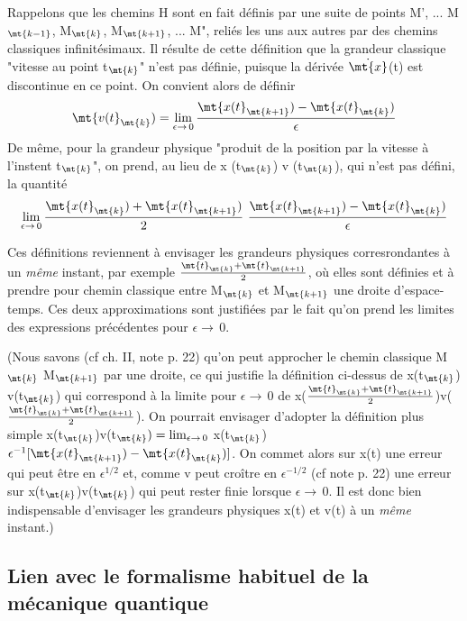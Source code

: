 Rappelons que les chemins H sont en fait définis par une
suite de points M', ... M$_\mt{k-1}$, M$_\mt{k}$, M$_\mt{k+1}$, ... M", reliés les uns aux autres
par des chemins classiques infinitésimaux. Il résulte de cette définition
que la grandeur classique "vitesse au point t$_\mt{k}$" n'est pas définie, puisque
la dérivée $\dot{\mt{x}}$(t) est discontinue en ce point. On convient alors de définir
\[
\mt{v(t}_\mt{k}) =
\lim_{\epsilon \to \,0} \frac{\mt{x(t}_{\mt{k+1}}) - \mt{x(t}_\mt{k})}{\epsilon}
\]
De même, pour la grandeur physique "produit de la position par la vitesse
à l'instent t$_\mt{k}$", on prend, au lieu de x (t$_\mt{k}$) v (t$_\mt{k}$), qui n'est pas défini,
la quantité
\[
\lim_{\epsilon \to \,0} \frac{\mt{x(t}_\mt{k}) + \mt{x(t}_\mt{k+1})}{2}
\ \frac{\mt{x(t}_{\mt{k+1}}) - \mt{x(t}_\mt{k})}{\epsilon}
\]

Ces définitions reviennent à envisager les grandeurs physiques
corresrondantes à un {\it même} instant, par exemple
$\frac{\mt{t}_\mt{k} + \mt{t}_\mt{k+1}}{2}$, où elles sont
définies et à prendre pour chemin classique entre M$_\mt{k}$ et M$_\mt{k+1}$ une droite
d'espace-temps. Ces deux approximations sont justifiées par le fait qu'on
prend les limites des expressions précédentes pour $\epsilon \to \,0$.

(Nous savons (cf ch. II, note p. 22) qu'on peut approcher le chemin classique
M$_\mt{k}$ M$_\mt{k+1}$ par une droite, ce qui justifie la définition ci-dessus
de x(t$_\mt{k}$) v(t$_\mt{k}$) qui correspond à la limite pour $\epsilon \to \,0$
de x($\frac{\mt{t}_\mt{k} + \mt{t}_\mt{k+1}}{2}$)v($\frac{\mt{t}_\mt{k} + \mt{t}_\mt{k+1}}{2}$).
On pourrait envisager d'adopter la définition plus simple
x(t$_\mt{k}$)v(t$_\mt{k}) =
\lim_{\epsilon \to \,0}$ x(t$_\mt{k}$) $\epsilon^{-1}[\mt{x(t}_\mt{k+1}) - \mt{x(t}_\mt{k})]$.
On commet alors sur x(t) une erreur qui peut être en $\epsilon^{1/2}$ et, comme v
peut croître en $\epsilon^{-1/2}$ (cf note p. 22) une erreur sur x(t$_\mt{k}$)v(t$_\mt{k}$) qui peut
rester finie lorsque $\epsilon \to \,0$. Il est donc bien indispensable d'envisager les
grandeurs physiques x(t) et v(t) à un {\it même} instant.)

\subsection{Lien avec le formalisme habituel de la mécanique quantique}%

